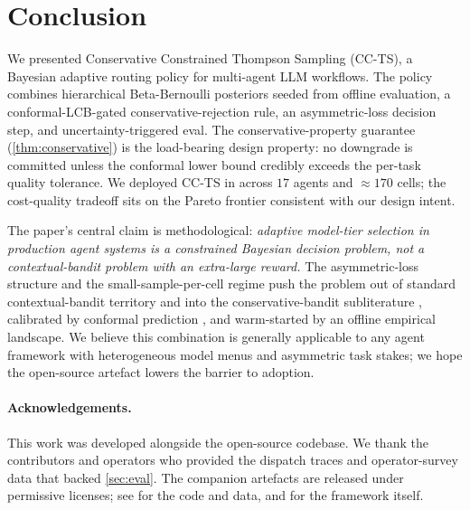 \section{Conclusion}
\label{sec:conclusion}

We presented Conservative Constrained Thompson Sampling (CC-TS), a Bayesian
adaptive routing policy for multi-agent LLM workflows. The policy combines
hierarchical Beta-Bernoulli posteriors seeded from offline evaluation, a
conformal-LCB-gated conservative-rejection rule, an asymmetric-loss
decision step, and uncertainty-triggered eval. The conservative-property
guarantee (\cref{thm:conservative}) is the load-bearing design property:
no downgrade is committed unless the conformal lower bound credibly
exceeds the per-task quality tolerance. We deployed CC-TS in \blackrim
across $17$ agents and $\approx 170$ cells; the cost-quality tradeoff
sits on the Pareto frontier consistent with our design intent.

The paper's central claim is methodological: \emph{adaptive model-tier
selection in production agent systems is a constrained Bayesian decision
problem, not a contextual-bandit problem with an extra-large reward.} The
asymmetric-loss structure and the small-sample-per-cell regime push the
problem out of standard contextual-bandit territory and into the
conservative-bandit subliterature \cite{wu2016conservative}, calibrated by
conformal prediction \cite{angelopoulos2021gentle}, and warm-started by an
offline empirical landscape. We believe this combination is generally
applicable to any agent framework with heterogeneous model menus and
asymmetric task stakes; we hope the open-source artefact lowers the
barrier to adoption.

\paragraph{Acknowledgements.}
This work was developed alongside the open-source \blackrim codebase. We
thank the contributors and operators who provided the dispatch traces and
operator-survey data that backed \cref{sec:eval}. The companion artefacts
are released under permissive licenses; see \cite{blackrim_paper_repo} for
the code and data, and \cite{german2026blackrim} for the framework itself.
